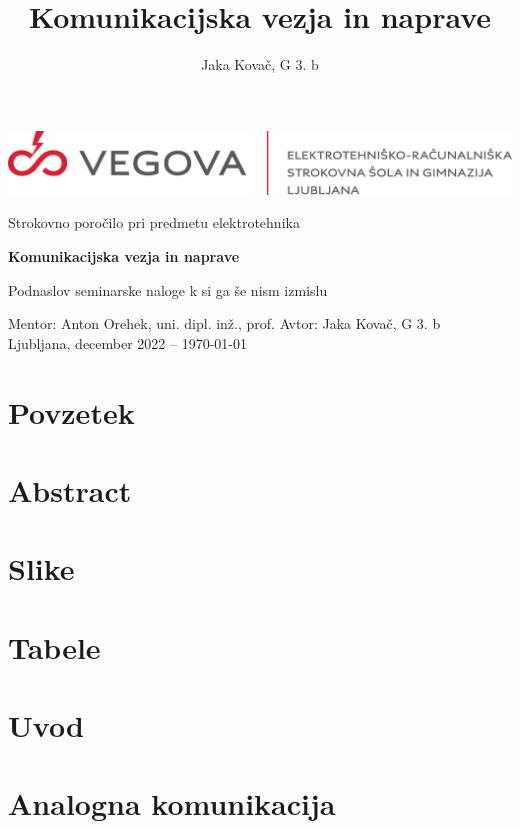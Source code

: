 \documentclass[12pt]{article}
\title{Komunikacijska vezja in naprave}
\author{Jaka Kovač, G 3. b}
\begin{document}

\begin{center}
    \thispagestyle{empty}
    \includegraphics[scale=1]{slike/logotip_vegova_leze_brezokvirja.png}
    
    \vspace{\fill} 
    Strokovno poročilo pri predmetu elektrotehnika

    \Huge{\textbf{Komunikacijska vezja in naprave}}

    \normalsize
    Podnaslov seminarske naloge k si ga še nism izmislu
    \vspace{\fill}

    Mentor: Anton Orehek, uni. dipl. inž., prof. \hfill Avtor: Jaka Kovač, G 3. b\\
    \null
    Ljubljana, december 2022 – \MMYYYYdate\today
\end{center}
\newpage
\null
\newpage

\section*{Povzetek}
\section*{Abstract}

\newpage
\tableofcontents

\newpage
\begingroup
\makeatletter
\section*{Slike}
\let\clearpage\relax
\section*{Tabele}
\makeatother
\endgroup


\newpage
\section{Uvod}
\newpage
\section{Analogna komunikacija}
\end{document}
